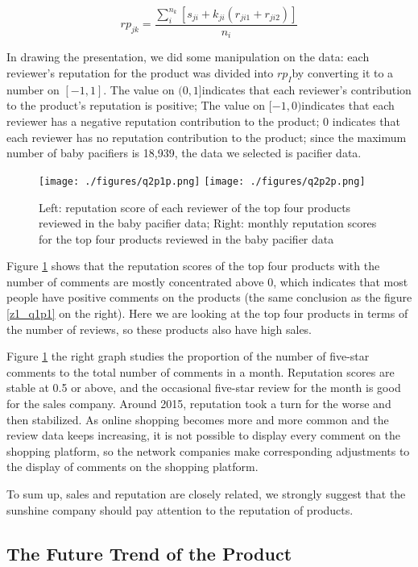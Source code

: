 \documentclass{mcmthesis}
\begin{document}
\begin{equation}\label{gs1}
rp_{jk}=\frac{\sum_{i}^{n_k}[s_{ji}+k_{ji}(r_{ji1}+r_{ji2})]}{n_i}
\end{equation}

In drawing the presentation, we did some manipulation on the data: each reviewer's reputation for the product was divided into $rp_{I}$by converting it to a number on $[-1,1]$. The value on $(0,1]$indicates that each reviewer's contribution to the product's reputation is positive; The value on $[-1,0)$indicates that each reviewer has a negative reputation contribution to the product; 0 indicates that each reviewer has no reputation contribution to the product; since the maximum number of baby pacifiers is 18,939, the data we selected is pacifier data.

\begin{figure}[H]
	\texttt{[image: ./figures/q2p1p.png]}
	\texttt{[image: ./figures/q2p2p.png]}
	\caption{Left: reputation score of each reviewer of the top four products reviewed in the baby pacifier data; Right: monthly reputation scores for the top four products reviewed in the baby pacifier data} \label{q2p1}
\end{figure}

Figure \ref{q2p1} shows that the reputation scores of the top four products with the number of comments are mostly concentrated above 0, which indicates that most people have positive comments on the products (the same conclusion as the figure \ref{z1_q1p1} on the right). Here we are looking at the top four products in terms of the number of reviews, so these products also have high sales.

Figure \ref{q2p1} the right graph studies the proportion of the number of five-star comments to the total number of comments in a month. Reputation scores are stable at 0.5 or above, and the occasional five-star review for the month is good for the sales company. Around 2015, reputation took a turn for the worse and then stabilized. As online shopping becomes more and more common and the review data keeps increasing, it is not possible to display every comment on the shopping platform, so the network companies make corresponding adjustments to the display of comments on the shopping platform.

To sum up, sales and reputation are closely related, we strongly suggest that the sunshine company should pay attention to the reputation of products.

\subsection{The Future Trend of the Product }
\end{document}
